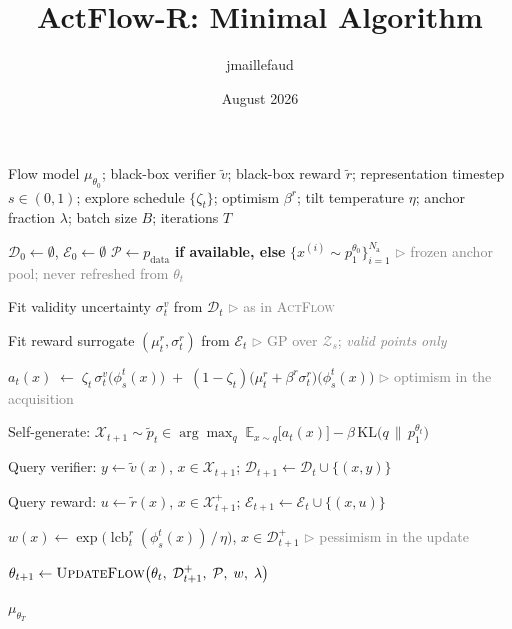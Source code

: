 \documentclass[a4paper]{article}
\title{ActFlow-R: Minimal Algorithm}
\author{jmaillefaud}
\date{August 2026}
\newcommand{\lcb}{\operatorname{lcb}}
\newcommand{\Dbuf}{\mathcal{D}}                        %
\newcommand{\Ebuf}{\mathcal{E}}                        %
\newcommand{\Anch}{\mathcal{P}}                        %
\newcommand{\Xbatch}{\mathcal{X}}
\newcommand{\UpdateFlow}{\textsc{UpdateFlow}}
\newcommand{\algcomment}[1]{\hfill\textcolor{gray}{$\triangleright$ \small #1}}
\begin{document}
\maketitle

\begin{algorithm}[t]
\caption{Active Flow Expansion for Reward Discovery (\textsc{ActFlow-R})}
\label{alg:actflow-r}
\begin{algorithmic}[1]
\Require Flow model $\mu_{\theta_0}$; black-box verifier $\tilde v$; black-box reward $\tilde r$;
         representation timestep $s\in(0,1)$; explore schedule $\{\zeta_t\}$;
         optimism $\beta^r$; tilt temperature $\eta$; anchor fraction $\lambda$;
         batch size $B$; iterations $T$

\State $\Dbuf_0\gets\emptyset$, \quad $\Ebuf_0\gets\emptyset$
\State $\Anch\gets p_{\mathrm{data}}$ \textbf{ if available, else } $\{x^{(i)}\sim p^{\theta_0}_1\}_{i=1}^{N_{\mathrm{a}}}$
       \algcomment{frozen anchor pool; never refreshed from $\theta_t$}


  \State Fit validity uncertainty $\sigma^v_t$ from $\Dbuf_t$
         \algcomment{as in \textsc{ActFlow}}

  \State Fit reward surrogate $(\mu^r_t,\sigma^r_t)$ from $\Ebuf_t$
         \algcomment{GP over $\mathcal{Z}_{s}$; \emph{valid points only}}

  \State $a_t(x)\;\gets\;\zeta_t\,\sigma^v_t\big(\phi^t_{s}(x)\big)
         \;+\;(1-\zeta_t)\big(\mu^r_t+\beta^r\sigma^r_t\big)\big(\phi^t_{s}(x)\big)$
         \algcomment{optimism in the acquisition}

  \State Self-generate:
         $\displaystyle \Xbatch_{t+1}\sim\tilde p_t\in
         \arg\max_{q}\;\mathbb{E}_{x\sim q}\big[a_t(x)\big]-\beta\,\mathrm{KL}\big(q\,\|\,p^{\theta_t}_1\big)$

  \State Query verifier: $y\gets\tilde v(x)$, $x\in\Xbatch_{t+1}$;\quad
         $\Dbuf_{t+1}\gets\Dbuf_t\cup\{(x,y)\}$

  \State Query reward: $u\gets\tilde r(x)$, $x\in\Xbatch^{+}_{t+1}$;\quad
         $\Ebuf_{t+1}\gets\Ebuf_t\cup\{(x,u)\}$

  \State $w(x)\gets\exp\!\big(\lcb^r_t(\phi^t_{s}(x))\,/\,\eta\big)$, \quad $x\in\Dbuf^{+}_{t+1}$
         \algcomment{pessimism in the update}

  \State $\theta_{t+1}\gets\UpdateFlow\big(\theta_t,\;\Dbuf^{+}_{t+1},\;\Anch,\;w,\;\lambda\big)$

\EndFor

\State \Return $\mu_{\theta_T}$
\end{algorithmic}
\end{algorithm}
\end{document}
